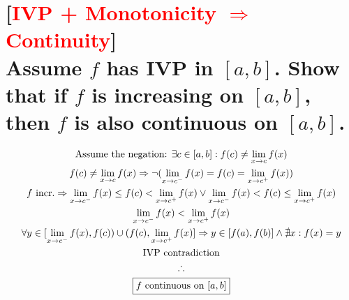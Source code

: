 \documentclass[letterpaper]{article}
\DeclarePairedDelimiter\range{[}{]}
\begin{document}
\section{[\textcolor{red}{IVP + Monotonicity $\Rightarrow$ Continuity}] \\ Assume $f$ has IVP in $[a,b]$. Show that if $f$ is increasing on $[a,b]$, then $f$ is also continuous on $[a,b]$.}
\begin{gather*}
	\text{Assume the negation: }\exists c\in\range{a,b}:f(c)\neq\lim_{x\rightarrow c}f(x) \\
	f(c)\neq\lim_{x\rightarrow c}f(x) \Rightarrow \neg(\lim_{x\rightarrow c^-}f(x)=f(c)= \lim_{x\rightarrow c^+}f(x)) \\
	f\text{ incr.}\Rightarrow\lim_{x\rightarrow c^-}f(x)\leq f(c)< \lim_{x\rightarrow c^+}f(x) \lor \lim_{x\rightarrow c^-}f(x)<f(c)\leq\lim_{x\rightarrow c^+}f(x) \\
	\lim_{x\rightarrow c^-}f(x)< \lim_{x\rightarrow c^+}f(x) \\
	\forall y\in[\lim_{x\rightarrow c^-}f(x),f(c))\cup(f(c),\lim_{x\rightarrow c^+}f(x)]\Rightarrow y\in[f(a),f(b)] \land \nexists x:f(x)=y \\
	\text{IVP contradiction} \\
	\therefore \\
	\boxed{f\text{ continuous on }\range{a,b}}
\end{gather*}
\end{document}
